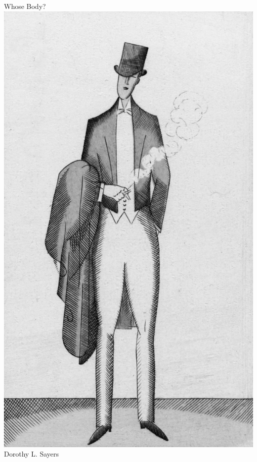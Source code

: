 \documentclass[
a5paper,
BCOR=7mm,
twoside,
DIV=calc,
11pt,
usegeometry,
chapterprefix,
headings=big]{scrbook} %
\newcommand{\reasonablyhuge}{\fontsize{50}{60}\selectfont}
\def\coverimagesize{.5\linewidth}
\newcommand{\HUGE}{\fontsize{90}{90}\selectfont}
\def\coverimagesize{0.55\linewidth}
\newcommand{\HUGE}{\fontsize{90}{90}\selectfont}
\begin{document}
\setlength{\epigraphwidth}{0.8\textwidth}
\renewcommand{\epigraphflush}{center}
\renewcommand{\sourceflush}{center}
\renewcommand*{\chaptermarkformat}{}
\renewcommand*{\chapterheadendvskip}{\vspace{10pt}}
\renewcommand*{\chapterheadstartvskip}{\vspace{0pt}}

\frontmatter
\pagestyle{empty}
\begin{titlepage}

   \recalctypearea

  \begin{center}\mytitlefont
{\HUGE Whose Body?}\\
\vspace{0.2cm}
\includegraphics[width=\coverimagesize]{dude}\\
\vspace{0.5cm}
\mytitlefont
{\reasonablyhuge Dorothy L. Sayers}\\
\end{center}



\end{titlepage}
\end{document}
